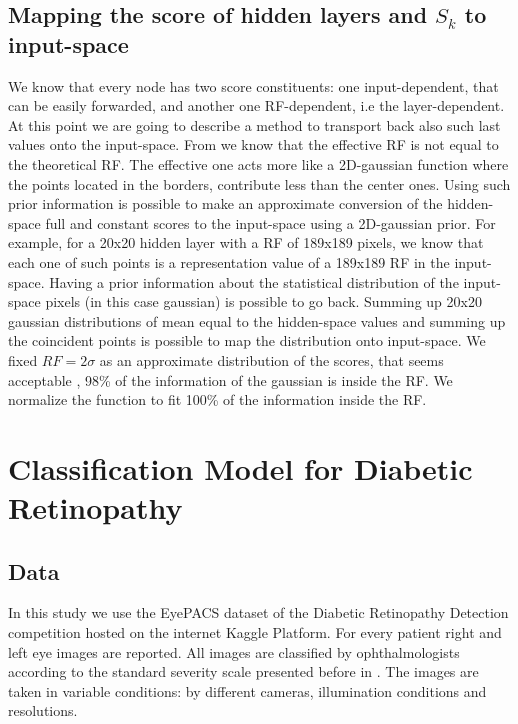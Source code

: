 \documentclass[review]{elsarticle}
\theoremstyle{definition} %
\theoremstyle{remark}
\begin{document}
\subsection{Mapping the score of hidden layers and $S_k$ to input-space}\label{sec:mapping-input}

We know that every node has two score constituents: one input-dependent, that can be easily forwarded, and another one RF-dependent, i.e the layer-dependent. At this point we are going to describe a method to transport back also such last values onto the input-space. From \cite{luo2016understanding} we know that the effective RF is not equal to the theoretical RF. The effective one acts more like a 2D-gaussian function where the points located in the borders, contribute less than the center ones. Using such prior information is possible to make an approximate conversion of the hidden-space full and constant scores to the input-space using a 2D-gaussian prior. For example, for a 20x20 hidden layer with a RF of 189x189 pixels, we know that each one of such points is a representation value of a 189x189 RF in the input-space. Having a prior information about the statistical distribution of the input-space pixels (in this case gaussian) is possible to go back. Summing up 20x20 gaussian distributions of mean equal to the hidden-space values and summing up the coincident points is possible to map the distribution onto input-space. We fixed $RF = 2\sigma$ as an approximate distribution of the scores, that seems acceptable \cite{luo2016understanding},  98\% of the information of the gaussian is inside the RF. We normalize the function to fit 100\% of the information inside the RF.

\section{Classification Model for Diabetic Retinopathy}\label{sec:class}

\subsection{Data}
\label{sec:data}

In this study we use the EyePACS dataset of the Diabetic Retinopathy Detection competition hosted on the internet Kaggle Platform.  For every patient right and left eye images are reported. All images are classified by ophthalmologists according to the standard severity scale presented before in \cite{diaclass}. The images are taken in variable conditions: by different cameras, illumination conditions and resolutions. 
\end{document}
